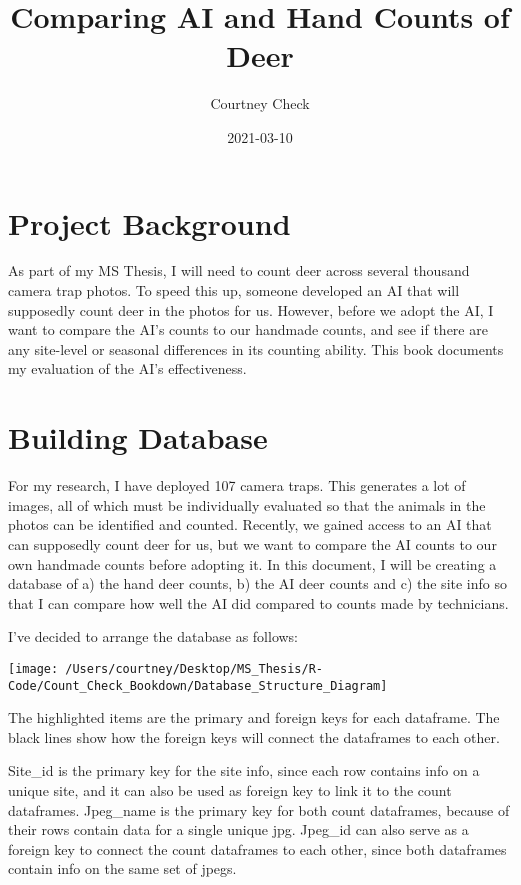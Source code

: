 \documentclass[
]{book}
\title{Comparing AI and Hand Counts of Deer}
\author{Courtney Check}
\date{2021-03-10}
\begin{document}
\maketitle

{
\setcounter{tocdepth}{1}
\tableofcontents
}
\hypertarget{project-background}{%
\chapter{Project Background}\label{project-background}}

As part of my MS Thesis, I will need to count deer across several thousand camera trap photos. To speed this up, someone developed an AI that will supposedly count deer in the photos for us. However, before we adopt the AI, I want to compare the AI's counts to our handmade counts, and see if there are any site-level or seasonal differences in its counting ability. This book documents my evaluation of the AI's effectiveness.

\hypertarget{building-database}{%
\chapter{Building Database}\label{building-database}}

For my research, I have deployed 107 camera traps. This generates a lot of images, all of which must be individually evaluated so that the animals in the photos can be identified and counted. Recently, we gained access to an AI that can supposedly count deer for us, but we want to compare the AI counts to our own handmade counts before adopting it. In this document, I will be creating a database of a) the hand deer counts, b) the AI deer counts and c) the site info so that I can compare how well the AI did compared to counts made by technicians.

I've decided to arrange the database as follows:

\begin{center}\texttt{[image: /Users/courtney/Desktop/MS\_Thesis/R-Code/Count\_Check\_Bookdown/Database\_Structure\_Diagram]} \end{center}

The highlighted items are the primary and foreign keys for each dataframe. The black lines show how the foreign keys will connect the dataframes to each other.

Site\_id is the primary key for the site info, since each row contains info on a unique site, and it can also be used as foreign key to link it to the count dataframes. Jpeg\_name is the primary key for both count dataframes, because of their rows contain data for a single unique jpg. Jpeg\_id can also serve as a foreign key to connect the count dataframes to each other, since both dataframes contain info on the same set of jpegs.
\end{document}
